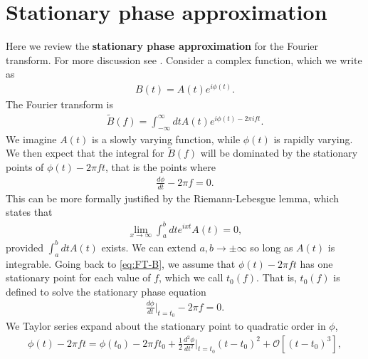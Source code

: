 \section{Stationary phase approximation}

Here we review the \textbf{stationary phase approximation} for the Fourier transform. 
For more discussion see \cite{bender1999advanced}.
Consider a complex function, which we write as
\begin{align}
    B\left(t\right) 
    =
    A\left(t\right)e^{i\phi\left(t\right)}
    .
\end{align}
The Fourier transform is
\begin{align}
    \label{eq:FT-B}
    \tilde{B}\left(f\right)
    =
    \int_{-\infty}^{\infty}dt A\left(t\right) e^{i\phi\left(t\right) - 2\pi i ft}
    .
\end{align}
We imagine $A\left(t\right)$ is a slowly varying function, while $\phi\left(t\right)$
is rapidly varying. We then expect that the integral for $\tilde{B}\left(f\right)$
will be dominated by the stationary points of $\phi\left(t\right) - 2\pi ft$,
that is the points where
\begin{align}
\label{eq:stationary-points-phi}
    \frac{d\phi}{dt}
    -
    2\pi f
    =
    0
    .
\end{align}
This can be more formally justified by the Riemann-Lebesgue lemma, 
which states that 
\begin{align}
    \lim_{x\to\infty}\int_{a}^{b} dt e^{ixt}A\left(t\right)
    =
    0
    ,
\end{align}
provided $\int_a^bdt A\left(t\right)$ exists. 
We can extend $a,b\to\pm\infty$ so long as $A\left(t\right)$ is integrable.
Going back to \eqref{eq:FT-B}, we assume that $\phi\left(t\right) - 2\pi f t$
has one stationary point for each value of $f$, which we call $t_0\left(f\right)$.
That is, $t_0\left(f\right)$ is defined to solve the stationary phase equation 
\begin{align}
    \frac{d\phi}{dt}\Big|_{t=t_0}
    -
    2\pi f
    =
    0
    .
\end{align}
We Taylor series expand about the stationary point to quadratic order in $\phi$,
\begin{align}
    \phi\left(t\right)
    -
    2\pi ft
    =
    \phi\left(t_0\right)
    -
    2\pi ft_0
    +
    \frac{1}{2}\frac{d^2\phi}{dt^2}\Big|_{t=t_0}\left(t-t_0\right)^2
    +
    \mathcal{O}\left[\left(t-t_0\right)^3\right] 
    ,
\end{align}
